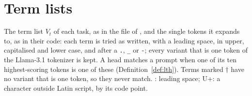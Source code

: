 \section{Term lists}\label{app:terms-simple}
The term list $V_t$ of each task, as in the file of \citet[App.~A.2.1]{yang2026shared}, and the single tokens it expands to, as in their code: each term is tried as written, with a leading space, in upper, capitalised and lower case, and after a \texttt{.}, \texttt{\_} or \texttt{-}; every variant that is one token of the Llama-3.1 tokenizer is kept. A head matches a prompt when one of its ten highest-scoring tokens is one of these (Definition~\ref{def:lth}). Terms marked $\dagger$ have no variant that is one token, so they never match. \textvisiblespace: leading space; U+: a character outside Latin script, by its code point.


